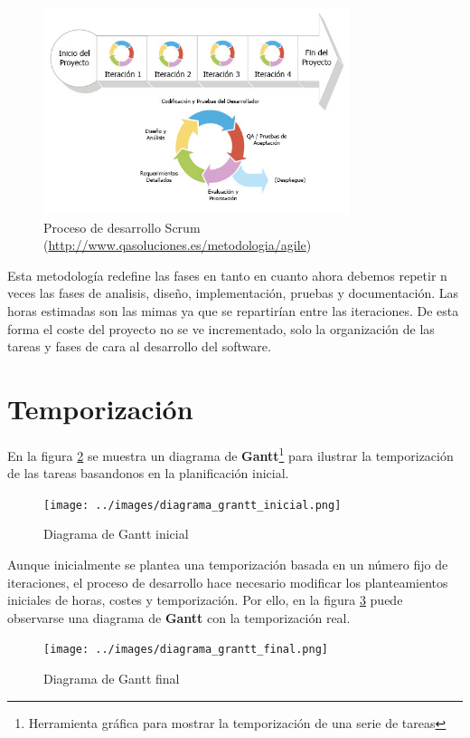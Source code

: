 \begin{figure}[!ht]
  \begin{center}
  \includegraphics[width=0.8\textwidth]{../images/scrum-iteration-detail-es.png}
  \caption{Proceso de desarrollo Scrum (\url{http://www.qasoluciones.es/metodologia/agile})}
  \label{fig:diag_scrum}
  \end{center}
\end{figure}

Esta metodología redefine las fases en tanto en cuanto ahora debemos repetir n veces las fases de analisis, diseño, implementación, pruebas y documentación. Las horas estimadas son las mimas ya que se repartirían entre las iteraciones. De esta forma el coste del proyecto no se ve incrementado, solo la organización de las tareas y fases de cara al desarrollo del software. 

\section{Temporización}

En la figura \ref{fig:diag_gantt_inicial} se muestra un diagrama de \textbf{Gantt}\footnote{Herramienta gráfica para mostrar la temporización de una serie de tareas} para ilustrar la temporización de las tareas basandonos en la planificación inicial. 

\begin{figure}[!ht]
  \begin{center}
  \texttt{[image: ../images/diagrama\_grantt\_inicial.png]}
  \caption{Diagrama de Gantt inicial}
  \label{fig:diag_gantt_inicial}
  \end{center}
\end{figure}

\bigskip
Aunque inicialmente se plantea una temporización basada en un número fijo de iteraciones, el proceso de desarrollo hace necesario modificar los planteamientos iniciales de horas, costes y temporización. Por ello, en la figura \ref{fig:diag_gantt_final} puede observarse una diagrama de \textbf{Gantt} con la temporización real.

\begin{figure}[!ht]
  \begin{center}
  \texttt{[image: ../images/diagrama\_grantt\_final.png]}
  \caption{Diagrama de Gantt final}
  \label{fig:diag_gantt_final}
  \end{center}
\end{figure}
